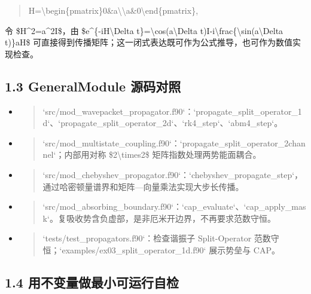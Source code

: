 \documentclass[UTF8,openany,11pt,fontset=fandol]{ctexbook}
\begin{document}
\begin{quote}
H=\textbackslash begin\{pmatrix\}0\&a\textbackslash\textbackslash a\&0\textbackslash end\{pmatrix\},
\end{quote}

令 \$H\^{}2=a\^{}2I\$，由 \$e\^{}\{-iH\textbackslash Delta
t\}=\textbackslash cos(a\textbackslash Delta
t)I-i\textbackslash frac\{\textbackslash sin(a\textbackslash Delta
t)\}aH\$
可直接得到传播矩阵；这一闭式表达既可作为公式推导，也可作为数值实现检查。

\subsection{\texorpdfstring{\textbf{1.3 GeneralModule
源码对照}}{1.3 GeneralModule 源码对照}}\label{generalmodule-ux6e90ux7801ux5bf9ux7167}

\begin{itemize}
\item
  \begin{quote}
  `src/mod\_wavepacket\_propagator.f90`：`propagate\_split\_operator\_1d`、`propagate\_split\_operator\_2d`、`rk4\_step`、`abm4\_step`。
  \end{quote}
\item
  \begin{quote}
  `src/mod\_multistate\_coupling.f90`：`propagate\_split\_operator\_2channel`；内部用对称
  \$2\textbackslash times2\$ 矩阵指数处理两势能面耦合。
  \end{quote}
\item
  \begin{quote}
  `src/mod\_chebyshev\_propagator.f90`：`chebyshev\_propagate\_step`，通过哈密顿量谱界和矩阵---向量乘法实现大步长传播。
  \end{quote}
\item
  \begin{quote}
  `src/mod\_absorbing\_boundary.f90`：`cap\_evaluate`、`cap\_apply\_mask`。复吸收势含负虚部，是非厄米开边界，不再要求范数守恒。
  \end{quote}
\item
  \begin{quote}
  `tests/test\_propagators.f90`：检查谐振子 Split-Operator
  范数守恒；`examples/ex03\_split\_operator\_1d.f90` 展示势垒与 CAP。
  \end{quote}
\end{itemize}

\subsection{\texorpdfstring{\textbf{1.4
用不变量做最小可运行自检}}{1.4 用不变量做最小可运行自检}}\label{ux7528ux4e0dux53d8ux91cfux505aux6700ux5c0fux53efux8fd0ux884cux81eaux68c0}
\end{document}
